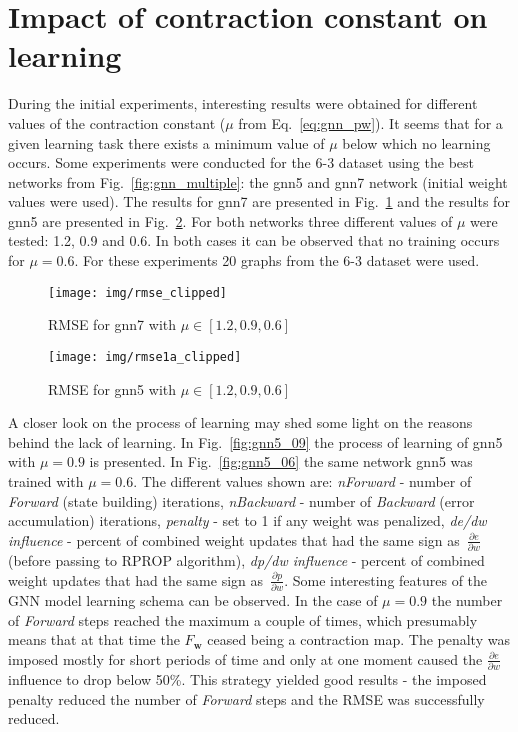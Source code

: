 \section{Impact of contraction constant on learning~\label{sec:contraction_constant}}
During the initial experiments, interesting results were obtained for different values of the contraction constant ($\mu$ from Eq.~\ref{eq:gnn_pw}). It seems that for a given learning task there exists a minimum value of $\mu$ below which no learning occurs. Some experiments were conducted for the 6-3 dataset using the best networks from Fig.~\ref{fig:gnn_multiple}: the gnn5 and gnn7 network (initial weight values were used). The results for gnn7 are presented in Fig.~\ref{fig:gnn7} and the results for gnn5 are presented in Fig.~\ref{fig:gnn5}. For both networks three different values of $\mu$ were tested: 1.2, 0.9 and 0.6. In both cases it can be observed that no training occurs for $\mu = 0.6$. For these experiments 20 graphs from the 6-3 dataset were used.

\begin{figure}[h!]
\begin{center}
	\texttt{[image: img/rmse\_clipped]}
	\caption{RMSE for gnn7 with $\mu \in [1.2, 0.9, 0.6]$}
	\label{fig:gnn7}
\end{center}
\end{figure}

\begin{figure}[h!]
\begin{center}
	\texttt{[image: img/rmse1a\_clipped]}
	\caption{RMSE for gnn5 with $\mu \in [1.2, 0.9, 0.6]$}
	\label{fig:gnn5}
\end{center}
\end{figure}

A closer look on the process of learning may shed some light on the reasons behind the lack of learning. In Fig.~\ref{fig:gnn5_09} the process of learning of gnn5 with $\mu = 0.9$ is presented. In Fig.~\ref{fig:gnn5_06} the same network gnn5 was trained with $\mu = 0.6$. The different values shown are: \emph{nForward} - number of \emph{Forward} (state building) iterations, \emph{nBackward} - number of \emph{Backward} (error accumulation) iterations, \emph{penalty} - set to 1 if any weight was penalized, \emph{de/dw influence} - percent of combined weight updates that had the same sign as~$\frac{\partial e}{\partial w}$ (before passing to RPROP algorithm), \emph{dp/dw influence} - percent of combined weight updates that had the same sign as~$\frac{\partial p}{\partial w}$. Some interesting features of the GNN model learning schema can be observed. In the case of $\mu = 0.9$ the number of \emph{Forward} steps reached the maximum a couple of times, which presumably means that at that time the $F_{\bm{w}}$ ceased being a contraction map. The penalty was imposed mostly for short periods of time and only at one moment caused the $\frac{\partial e}{\partial w}$ influence to drop below 50\%. This strategy yielded good results - the imposed penalty reduced the number of \emph{Forward} steps and the RMSE was successfully reduced.

